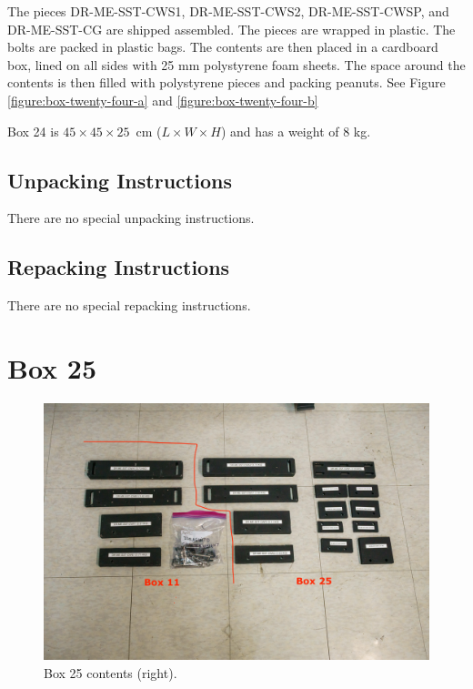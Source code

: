\documentclass{article}
\begin{document}
The pieces DR-ME-SST-CWS1, DR-ME-SST-CWS2, DR-ME-SST-CWSP, and DR-ME-SST-CG are shipped assembled. The pieces are wrapped in plastic. The bolts are packed in plastic bags. The contents are then placed in a cardboard box, lined on all sides with 25 mm polystyrene foam sheets. The space around the contents is then filled with polystyrene pieces and packing peanuts. See Figure \ref{figure:box-twenty-four-a} and \ref{figure:box-twenty-four-b}

Box 24 is  $45 \times 45 \times 25$~cm ($L \times W \times H$) and has a weight of 8 kg.

\subsection{Unpacking Instructions}

There are no special unpacking instructions.

\subsection{Repacking Instructions}

There are no special repacking instructions.


\clearpage
\section{Box 25}

\begin{figure}[bp]
\begin{center}
\includegraphics[width=0.80\linewidth]{figures/20201208T175508.jpg}
\end{center}
\caption{Box 25 contents (right).}
\label{figure:box-twenty-five-contents}
\end{figure}
\end{document}
